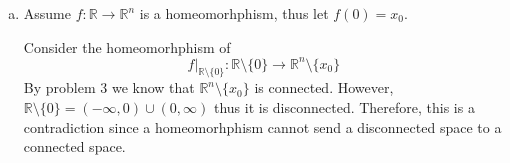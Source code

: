 \documentclass[12pt, letterpaper]{article}
\newcounter{problem}
\newcommand{\R}{\mathbb{R}}
\begin{document}
\begin{enumerate}[(a)]
\begin{enumerate}[1.]
        Thus, no homeomorphism exists between \((0,1)\) and \([0,1]\).
    
        \item \((0,1]\) vs. \([0,1]\)
        
        Assume: There exists a homeomorphism
        \[
        g:[0,1]\to (0,1].
        \]
        
        Since \(0,1\) is an element of \([0,1]\), there must be some \(x_0,x_1\in (0,1]\) with
        \[
        g(0)=x_0, \quad g(1)=x_1
        \]
        
        - In \([0,1]\), remove \(0,1\):
          \[
          [0,1]\setminus\{0,1\}=(0,1),
          \]
          which is connected by same logic as above.
        
        - In \((0,1]\), remove the point \(x_0,x_1\):
          \[
          (0,1]\setminus\{x_0,x_1\}
          \]
          If $x_0$ or $x_1 = 1$ then WLOG let $x_1=1$
          \[
            (0,1]\setminus\{x_0,x_1\}=(0,x_0) \cup (x_0,1)
          \]
          If $x_0, x_1 \neq 1$ then WLOG let $x_0 < x_1$
          \[
            (0,1]\setminus\{x_0,x_1\}=(0,x_0) \cup (x_0,x_1) \cup (x_1,1]
          \]
          these are both disconnected.
        
        Again, we have a homeomorphism sending a connected space to a disconnected space, which is impossible.
        
        Thus, no homeomorphism exists between \((0,1]\) and \([0,1]\).
    \end{enumerate}

    \item Assume $f: \R \to \R^n$ is a homeomorhphism, thus let $f(0)=x_0$.
    
    Consider the homeomorhphism of
    \[f\vert_{\R\setminus \{0\}}: \R \setminus \{0\} \to \R^n \setminus \{x_0\}\]
    By problem 3 we know that $\R^n \setminus \{x_0\}$ is connected. However, $\R \setminus \{0\}=(-\infty,0) \cup (0, \infty)$ thus it is disconnected. Therefore, this is a contradiction since a homeomorhphism cannot send a disconnected space to a connected space.
\end{enumerate}
\end{document}
